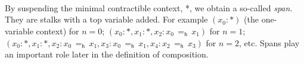 \begin{code}\>\<%
\\
\> \<[13]%
\>[13]\AgdaSymbol{:}  \AgdaSymbol{\{} \AgdaSymbol{\}(} \AgdaSymbol{:}  \AgdaSymbol{)}    \<[45]%
\>[45]\<%
\\
\>[0]\<[13]%
\>[13]  \AgdaSymbol{(}  \AgdaSymbol{)}\<%
\\
\>\<\end{code}
By suspending the minimal contractible context,
*, we obtain a so-called \emph{span}. They are stalks with a top variable added. For example $(x_0: *)$ (the one-variable
context) for $n=0$; $(x_0 : *, x_1 : *, x_2 : x_0\,=_\mathsf{h}\,x_1)$ for
$n=1$; $(x_0 : *, x_1 : *, x_2 : x_0\,=_\mathsf{h}\,x_1, x_3 :
x_0\,=_{\mathsf{h}}\,x_1, x_4 : x_2\,=_\mathsf{h}\,x_3)$ for $n=2$, etc. 
Spans play
an important role later in the definition of composition. 


